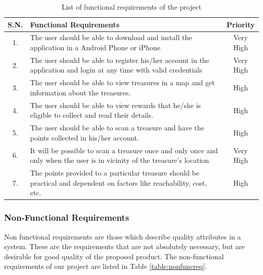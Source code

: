 \documentclass[12pt, a4paper, oneside]{article}
\begin{document}
\begin{table}[H]
\begin{tabularx}{\linewidth}{|c|X|c|}
\hline
\rowcolor[HTML]{C0C0C0} 
{\color[HTML]{000000} S.N.} & {\color[HTML]{000000} Functional Requirements}                                                                             & {\color[HTML]{000000} Priority} \\ \hline
1.                          & The user should be able to download and install the application in a Android Phone or iPhone                               & Very High                       \\ \hline
2.                          & The user should be able to register his/her account in the application and login at any time with valid credentials        & Very High                       \\ \hline
3.                          & The user should be able to view treasures in a map and get information about the treasures.                                & High                            \\ \hline
4.                          & The user should be able to view rewards that he/she is eligible to collect and read their details.                         & High                            \\ \hline
5.                          & The user should be able to scan a treasure and have the points collected in his/her account.                               & High                            \\ \hline
6.                          & It will be possible to scan a treasure once and only once and only when the user is in vicinity of the treasure's location & Very High                       \\ \hline
7.                          & The points provided to a particular treasure should be practical and dependent on factors like reachability, cost, etc.    & High                            \\ \hline
\end{tabularx}
\caption{List of functional requirements of the project}
\label{table:functionalreq}
\end{table}

\subsubsection{Non-Functional Requirements}
Non functional requirements are those which describe quality attributes in a system. These are the requirements that are not absolutely necessary, but are desirable for good quality of the proposed product. The non-functional requirements of our project are listed in Table \ref{table:nonfuncreq}.
\end{document}

